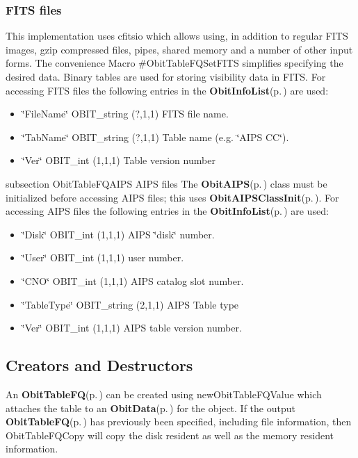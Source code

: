 \subsubsection{FITS files}\label{ObitTableWX_8h_TableFITS}
This implementation uses cfitsio which allows using, in addition to regular FITS images, gzip compressed files, pipes, shared memory and a number of other input forms. The convenience Macro \#Obit\-Table\-FQSet\-FITS simplifies specifying the desired data. Binary tables are used for storing visibility data in FITS. For accessing FITS files the following entries in the {\bf Obit\-Info\-List}{\rm (p.\,\pageref{structObitInfoList})} are used: \begin{itemize}
\item \char`\"{}File\-Name\char`\"{} OBIT\_\-string (?,1,1) FITS file name. \item \char`\"{}Tab\-Name\char`\"{} OBIT\_\-string (?,1,1) Table name (e.g. \char`\"{}AIPS CC\char`\"{}). \item \char`\"{}Ver\char`\"{} OBIT\_\-int (1,1,1) Table version number\end{itemize}
subsection Obit\-Table\-FQAIPS AIPS files The {\bf Obit\-AIPS}{\rm (p.\,\pageref{structObitAIPS})} class must be initialized before accessing AIPS files; this uses {\bf Obit\-AIPSClass\-Init}{\rm (p.\,\pageref{ObitAIPS_8c_a5})}. For accessing AIPS files the following entries in the {\bf Obit\-Info\-List}{\rm (p.\,\pageref{structObitInfoList})} are used: \begin{itemize}
\item \char`\"{}Disk\char`\"{} OBIT\_\-int (1,1,1) AIPS \char`\"{}disk\char`\"{} number. \item \char`\"{}User\char`\"{} OBIT\_\-int (1,1,1) user number. \item \char`\"{}CNO\char`\"{} OBIT\_\-int (1,1,1) AIPS catalog slot number. \item \char`\"{}Table\-Type\char`\"{} OBIT\_\-string (2,1,1) AIPS Table type \item \char`\"{}Ver\char`\"{} OBIT\_\-int (1,1,1) AIPS table version number.\end{itemize}
\subsection{Creators and Destructors}\label{ObitTableFQ_8h_ObitTableFQaccess}
An {\bf Obit\-Table\-FQ}{\rm (p.\,\pageref{structObitTableFQ})} can be created using new\-Obit\-Table\-FQValue which attaches the table to an {\bf Obit\-Data}{\rm (p.\,\pageref{structObitData})} for the object. If the output {\bf Obit\-Table\-FQ}{\rm (p.\,\pageref{structObitTableFQ})} has previously been specified, including file information, then Obit\-Table\-FQCopy will copy the disk resident as well as the memory resident information.


